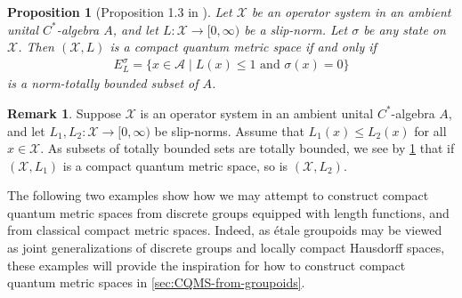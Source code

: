 \documentclass[11pt,a4paper,oneside,final,reqno]{amsart}
\newtheorem{proposition}[lemma]{Proposition}
\theoremstyle{definition}
\newtheorem{remark}[lemma]{Remark}
\newcommand{\cX}{\mathcal{X}}
\newcommand{\A}{\mathcal{A}}
\numberwithin{equation}{section}
\begin{document}
	
		\begin{proposition}[Proposition 1.3 in \cite{OzawaRieffel2004}]\label{prop:Ozawa-Rieffel-characterization}
		Let $\cX$ be an operator system in an ambient unital $C^*$-algebra $A$, and let $L \colon \cX \to [0,\infty)$ be a slip-norm.  Let $\sigma$ be any state on $\cX$.  
		Then 
		$(\cX,L)$ is a compact quantum metric space if and only if
		\begin{align*}
				E^\sigma_L = \{ x \in \A \mid L(x) \leq 1 \text{ and } \sigma(x) = 0 \}
			\end{align*}
		is a norm-totally bounded subset of $A$.  
	\end{proposition}
	
	\begin{remark}\label{remark:smaller-seminorm-CQMS-implies-CQMS}
		Suppose $\cX$ is an operator system in an ambient unital $C^*$-algebra $A$, and let $L_1, L_2 \colon \cX \to [0,\infty)$ be slip-norms. Assume that $L_1(x) \leq L_2(x)$ for all $x \in \cX$. As subsets of totally bounded sets are totally bounded, we see by \cref{prop:Ozawa-Rieffel-characterization}  that if $(\cX, L_1)$ is a compact quantum metric space, so is $(\cX, L_2)$.
	\end{remark}

	The following two examples show how we may attempt to construct compact quantum metric spaces from discrete groups equipped with length functions, and from classical compact metric spaces. Indeed, as \'etale groupoids may be viewed as joint generalizations of discrete groups and locally compact Hausdorff spaces, these examples will provide the inspiration for how to construct compact quantum metric spaces 
	in \cref{sec:CQMS-from-groupoids}.
	
\end{document}
